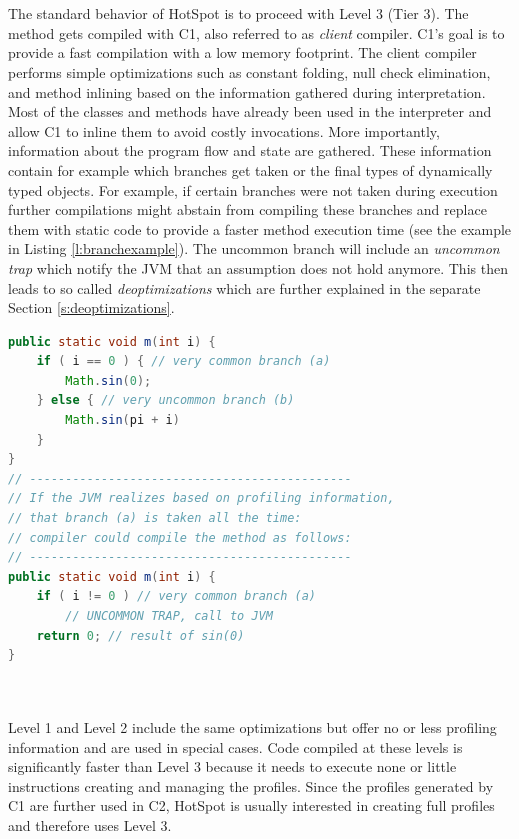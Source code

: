 \\\\
The standard behavior of HotSpot is to proceed with Level 3 (Tier 3). The method gets compiled with C1, also referred to as \textit{client} compiler.
C1's goal is to provide a fast compilation with a low memory footprint.
The client compiler performs simple optimizations such as constant folding, null check elimination, and method inlining based on the information gathered during interpretation. 
Most of the classes and methods have already been used in the interpreter and allow C1 to inline them to avoid costly invocations.
More importantly, information about the program flow and state are gathered. These information contain for example which branches get taken or the final types of dynamically typed objects. 
For example, if certain branches were not taken during execution further compilations might abstain from compiling these branches and replace them with static code to provide a faster method execution time (see the example in Listing \ref{l:branchexample}). The uncommon branch will include an \textit{uncommon trap} which notify the JVM that an assumption does not hold anymore. This then leads to so called \textit{deoptimizations} which are further explained in the separate Section \ref{s:deoptimizations}.
\begin{lstlisting}[float,caption=Example that show potential compilation based on profiling information,label=l:branchexample,language=Java]
public static void m(int i) {
    if ( i == 0 ) { // very common branch (a)
        Math.sin(0);
    } else { // very uncommon branch (b)
        Math.sin(pi + i)
    }
}
// ---------------------------------------------
// If the JVM realizes based on profiling information,
// that branch (a) is taken all the time:
// compiler could compile the method as follows:
// ---------------------------------------------
public static void m(int i) {
    if ( i != 0 ) // very common branch (a)
        // UNCOMMON TRAP, call to JVM
    return 0; // result of sin(0)
}
\end{lstlisting}
\\\\
Level 1 and Level 2 include the same optimizations but offer no or less profiling information and are used in special cases. Code compiled at these levels is significantly faster than Level 3 because it needs to execute none or little instructions creating and managing the profiles. Since the profiles generated by C1 are further used in C2, HotSpot is usually interested in creating full profiles and therefore uses Level 3.

